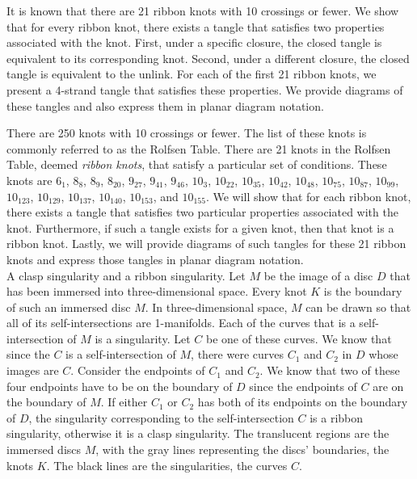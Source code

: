 
\diagrams
\theorems

\begin{paperabs}
It is known that there are 21 ribbon knots with 10 crossings or fewer.
We show that for every ribbon knot, there exists a tangle that satisfies two
properties associated with the knot.
First, under a specific closure, the closed tangle is equivalent to its
corresponding knot.
Second, under a different closure, the closed tangle is equivalent to the
unlink.
For each of the first 21 ribbon knots, we present a 4-strand tangle that
satisfies these properties.
We provide diagrams of these tangles and also express them in planar diagram
notation.
\end{paperabs}
\begin{paper}

There are 250 knots with 10 crossings or fewer.
The list of these knots is commonly referred to as the Rolfsen Table.
There are 21 knots in the Rolfsen Table, deemed \textit{ribbon knots}, that
satisfy a particular set of conditions.
These knots are $6_1$, $8_8$, $8_9$, $8_{20}$, $9_{27}$, $9_{41}$, $9_{46}$,
$10_3$, $10_{22}$, $10_{35}$, $10_{42}$, $10_{48}$, $10_{75}$, $10_{87}$,
$10_{99}$, $10_{123}$, $10_{129}$, $10_{137}$, $10_{140}$, $10_{153}$, and
$10_{155}$.
We will show that for each ribbon knot, there exists a tangle that satisfies two
particular properties associated with the knot.
Furthermore, if such a tangle exists for a given knot, then that knot is a
ribbon knot.
Lastly, we will provide diagrams of such tangles for these 21 ribbon knots and
express those tangles in planar diagram notation.\\

{A clasp singularity and a ribbon singularity.
Let $M$ be the image of a disc $D$ that has been immersed into three-dimensional
space.
Every knot $K$ is the boundary of such an immersed disc $M$.
In three-dimensional space, $M$ can be drawn so that all of its
self-intersections are 1-manifolds.
Each of the curves that is a self-intersection of $M$ is a singularity.
Let $C$ be one of these curves.
We know that since the $C$ is a self-intersection of $M$, there were curves
$C_1$ and $C_2$ in $D$ whose images are $C$.
Consider the endpoints of $C_1$ and $C_2$.
We know that two of these four endpoints have to be on the boundary of $D$ since
the endpoints of $C$ are on the boundary of $M$.
If either $C_1$ or $C_2$ has both of its endpoints on the boundary of $D$, the
singularity corresponding to the self-intersection $C$ is a ribbon singularity,
otherwise it is a clasp singularity.
The translucent regions are the immersed discs $M$, with the gray lines
representing the discs' boundaries, the knots $K$.
The black lines are the singularities, the curves $C$.}


\end{paper}
